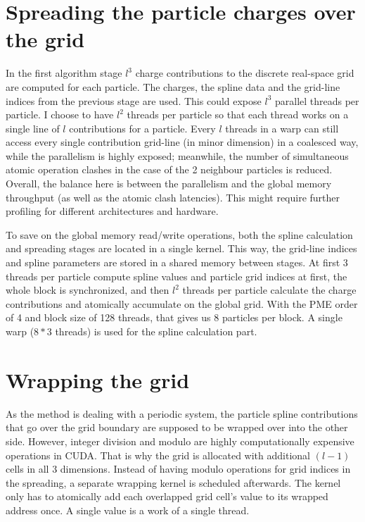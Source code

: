 \documentclass[12pt,a4paper]{report}
\newcommand{\draft}[1]{#1}
\begin{document}
\section{Spreading the particle charges over the grid}
In the first algorithm stage $l^3$ charge contributions to the discrete real-space grid are computed for each particle. The charges, the spline data and the grid-line indices from the previous stage are used.
This could expose $l^3$ parallel threads per particle. 
I choose to have $l^2$ threads per particle so that each thread works on a single line of $l$ contributions for a particle. Every $l$ threads in a warp can still access every single contribution grid-line (in minor dimension) in a coalesced way, while the parallelism is highly exposed; meanwhile, the number of simultaneous atomic operation clashes in the case of the 2 neighbour particles is reduced. Overall, the balance here is between the parallelism and the global memory throughput (as well as the atomic clash latencies). This might require further profiling for different architectures and hardware.

To save on the global memory read/write operations, both the spline calculation and spreading stages are located in a single kernel. This way, the grid-line indices and spline parameters are stored in a shared memory between stages. At first 3 threads per particle compute spline values and particle grid indices at first, the whole block is synchronized, and then $l^2$ threads per particle calculate the charge contributions and atomically accumulate on the global grid. With the PME order of 4 and block size of 128 threads, that gives us 8 particles per block. A single warp ($8 * 3$ threads) is used for the spline calculation part.




\section{Wrapping the grid}
As the method is dealing with a periodic system, the particle spline contributions that go over the grid boundary are supposed to be wrapped over into the other side.
However, integer division and modulo are highly computationally expensive operations in CUDA. %
That is why the grid is allocated with additional $(l-1)$ cells in all 3 dimensions. Instead of having modulo operations for grid indices in the spreading, 
a separate wrapping kernel is scheduled afterwards. The kernel only has to atomically add each overlapped grid cell's value to its wrapped address once. A single value is a work of a single thread.
\end{document}

